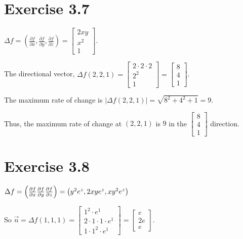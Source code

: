 \documentclass[11pt,fleqn]{book} %
\begin{document}
\section*{Exercise 3.7}

$\Delta f = \left( \frac{\partial f}{\partial x}, \frac{\partial f}{\partial y}, \frac{\partial f}{\partial z} \right) = \begin{bmatrix} 2xy \\ x^2 \\ 1 \end{bmatrix}$. 

The directional vector, $\Delta f(2, 2, 1) = \begin{bmatrix} 2 \cdot 2 \cdot 2 \\ 2^2 \\ 1 \end{bmatrix} = \begin{bmatrix} 8 \\ 4 \\ 1 \end{bmatrix}$. 

The maximum rate of change is $| \Delta f(2, 2, 1) | = \sqrt{8^2 + 4^2 + 1} = 9$. 

Thus, the maximum rate of change at $(2, 2, 1)$ is $9$ in the $\begin{bmatrix} 8 \\ 4 \\ 1 \end{bmatrix}$ direction. 

\section*{Exercise 3.8}

$\Delta f  = \left( \frac{\partial f}{\partial x} \\ \frac{\partial f}{\partial y} \\ \frac{\partial f}{\partial z} \right) = \left( y^2e^z, 2xye^z, xy^2e^z \right)$

So $\vec{n} = \Delta f(1,1,1) = \begin{bmatrix} 1^2 \cdot e^1 \\ 2 \cdot 1 \cdot 1 \cdot e^1 \\ 1 \cdot 1^2 \cdot e^1 \end{bmatrix} = \begin{bmatrix} e \\ 2e \\ e \end{bmatrix}$.
\end{document}
